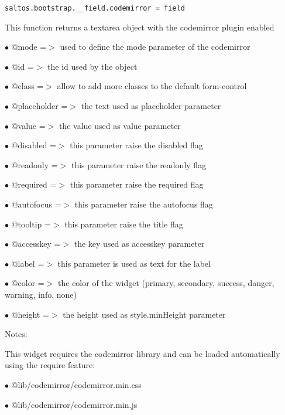 \documentclass[a4paper]{book}
\begin{document}
\begin{lstlisting}
saltos.bootstrap.__field.codemirror = field
\end{lstlisting}

This function returns a textarea object with the codemirror plugin enabled

\begin{compactitem}
\item[\color{myblue}$\bullet$] @mode        =$>$ used to define the mode parameter of the codemirror
\item[\color{myblue}$\bullet$] @id          =$>$ the id used by the object
\item[\color{myblue}$\bullet$] @class       =$>$ allow to add more classes to the default form-control
\item[\color{myblue}$\bullet$] @placeholder =$>$ the text used as placeholder parameter
\item[\color{myblue}$\bullet$] @value       =$>$ the value used as value parameter
\item[\color{myblue}$\bullet$] @disabled    =$>$ this parameter raise the disabled flag
\item[\color{myblue}$\bullet$] @readonly    =$>$ this parameter raise the readonly flag
\item[\color{myblue}$\bullet$] @required    =$>$ this parameter raise the required flag
\item[\color{myblue}$\bullet$] @autofocus   =$>$ this parameter raise the autofocus flag
\item[\color{myblue}$\bullet$] @tooltip     =$>$ this parameter raise the title flag
\item[\color{myblue}$\bullet$] @accesskey   =$>$ the key used as accesskey parameter
\item[\color{myblue}$\bullet$] @label       =$>$ this parameter is used as text for the label
\item[\color{myblue}$\bullet$] @color       =$>$ the color of the widget (primary, secondary, success, danger, warning, info, none)
\item[\color{myblue}$\bullet$] @height      =$>$ the height used as style.minHeight parameter
\end{compactitem}

Notes:

This widget requires the codemirror library and can be loaded automatically using the require
feature:

\begin{compactitem}
\item[\color{myblue}$\bullet$] @lib/codemirror/codemirror.min.css
\item[\color{myblue}$\bullet$] @lib/codemirror/codemirror.min.js
\end{compactitem}
\end{document}
